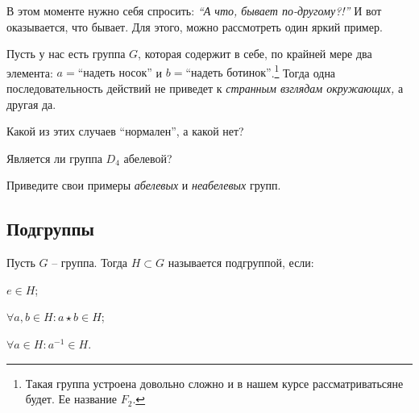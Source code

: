\setcounter{footnote}{1}
В этом моменте нужно себя спросить: \emph{``А что, бывает по-другому?!''} И вот оказывается, что бывает.
Для этого, можно рассмотреть один яркий пример. 
\begin{example}
    Пусть у нас есть группа $G$, которая содержит в себе, по крайней мере два элемента: 
    $a = \text{``надеть носок''}$ и $b = \text{``надеть ботинок''}$.\footnote{
    Такая группа устроена довольно сложно и в нашем курсе рассматриватьсяне будет. Ее название $F_2$.}
    Тогда одна последовательность действий не приведет к \emph{странным взглядам окружающих,} а другая да.
\end{example}

\begin{practice}
   Какой из этих случаев ``нормален'', а какой нет? 
\end{practice}

\begin{practice}
    Является ли группа $D_4$ абелевой?
\end{practice}

\begin{practice}
    Приведите свои примеры \emph{абелевых} и \emph{неабелевых} групп. 
\end{practice}

\subsection{Подгруппы}
\begin{definition}
    [Подгруппа]
    Пусть $G$ -- группа. Тогда $H \subset G$ называется подгруппой, если:
    \begin{conditions}
    \item $e \in H$;
    \item $\forall a, b \in H: a \star b \in H$;
    \item $\forall a \in H: a^{-1} \in H$.
    \end{conditions}
\end{definition}

